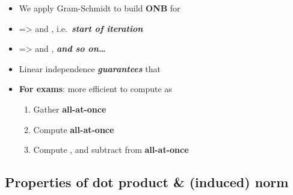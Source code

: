 \begin{itemize}
\begin{itemize}
          \item
                We apply Gram-Schmidt to build \textbf{ONB}
                for 
          \item
                 =>
                 and
                ,
                i.e.~\textbf{\emph{start of iteration}}
          \item
                 =>
                and ,
                \textbf{\emph{and so on\ldots{}}}
          \item
                Linear independence \textbf{\emph{guarantees}} that
          \item
                \textbf{For exams}: more efficient to compute as

                \begin{enumerate}
                  \def\labelenumi{\arabic{enumi})}

                  \item
                        Gather
                        \textbf{all-at-once}
                  \item
                        Compute
                        \textbf{all-at-once}
                  \item
                        Compute , and
                        subtract from  \textbf{all-at-once}
                \end{enumerate}
        \end{itemize}
\end{itemize}

\subsection*{Properties of dot product \& (induced)
  norm}

